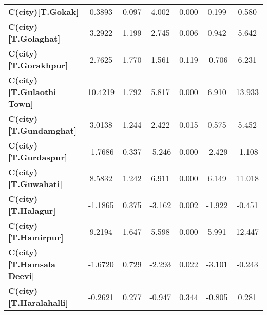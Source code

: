 \begin{center}
\begin{tabular}{lcccccc}
\textbf{C(city)[T.Gokak]}                                                                           &       0.3893  &        0.097     &     4.002  &         0.000        &        0.199    &        0.580     \\
\textbf{C(city)[T.Golaghat]}                                                                        &       3.2922  &        1.199     &     2.745  &         0.006        &        0.942    &        5.642     \\
\textbf{C(city)[T.Gorakhpur]}                                                                       &       2.7625  &        1.770     &     1.561  &         0.119        &       -0.706    &        6.231     \\
\textbf{C(city)[T.Gulaothi Town]}                                                                   &      10.4219  &        1.792     &     5.817  &         0.000        &        6.910    &       13.933     \\
\textbf{C(city)[T.Gundamghat]}                                                                      &       3.0138  &        1.244     &     2.422  &         0.015        &        0.575    &        5.452     \\
\textbf{C(city)[T.Gurdaspur]}                                                                       &      -1.7686  &        0.337     &    -5.246  &         0.000        &       -2.429    &       -1.108     \\
\textbf{C(city)[T.Guwahati]}                                                                        &       8.5832  &        1.242     &     6.911  &         0.000        &        6.149    &       11.018     \\
\textbf{C(city)[T.Halagur]}                                                                         &      -1.1865  &        0.375     &    -3.162  &         0.002        &       -1.922    &       -0.451     \\
\textbf{C(city)[T.Hamirpur]}                                                                        &       9.2194  &        1.647     &     5.598  &         0.000        &        5.991    &       12.447     \\
\textbf{C(city)[T.Hamsala Deevi]}                                                                   &      -1.6720  &        0.729     &    -2.293  &         0.022        &       -3.101    &       -0.243     \\
\textbf{C(city)[T.Haralahalli]}                                                                     &      -0.2621  &        0.277     &    -0.947  &         0.344        &       -0.805    &        0.281     \\

\end{tabular}
\end{center}
